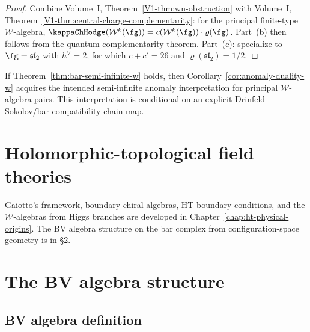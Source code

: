 \begin{proof}
Combine Volume~I, Theorem~\ref{V1-thm:wn-obstruction} with
Volume~I, Theorem~\ref{V1-thm:central-charge-complementarity}: for the principal
finite-type $\mathcal{W}$-algebra,
$\kappaChHodge(\mathcal{W}^k(\fg)) = c(\mathcal{W}^k(\fg))\cdot\varrho(\fg)$.
Part~(b) then follows from the quantum complementarity theorem.
Part~(c): specialize to $\fg = \mathfrak{sl}_2$ with $h^\vee = 2$,
for which $c + c' = 26$ and $\varrho(\mathfrak{sl}_2)=1/2$.
\end{proof}

\begin{remark}
\label{rem:w-semi-infinite-conditional}
If Theorem~\ref{thm:bar-semi-infinite-w} holds, then
Corollary~\ref{cor:anomaly-duality-w} acquires the intended
semi-infinite anomaly interpretation for principal
$\mathcal{W}$-algebra pairs. This interpretation is conditional on an
explicit Drinfeld--Sokolov/bar compatibility chain map.
\end{remark}

\section{Holomorphic-topological field theories}

Gaiotto's framework, boundary chiral algebras, HT boundary
conditions, and the $\mathcal{W}$-algebras from Higgs branches are
developed in Chapter~\ref{chap:ht-physical-origins}. The BV algebra
structure on the bar complex from configuration-space geometry is
in \S\ref{sec:complete-bv-structure}.

\label{rem:ht-from-n4-sym}%
\label{rem:boundary-chiral-algebra-bv}%
\label{rem:w-algebra-bar-cobar}%


\section{The BV algebra structure}
\label{sec:complete-bv-structure}

\subsection{BV algebra definition}

